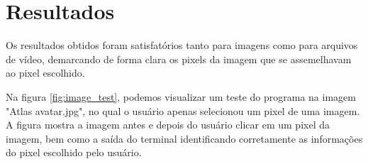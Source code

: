 \documentclass{bmvc2k}
\begin{document}

\section{Resultados}
Os resultados obtidos foram satisfatórios tanto para imagens como para arquivos de vídeo, demarcando de forma clara os pixels da imagem que se assemelhavam ao pixel escolhido.

Na figura \ref{fig:image_test}, podemos visualizar um teste do programa na imagem "Atlas avatar.jpg", no qual o usuário apenas selecionou um pixel de uma imagem. A figura mostra a imagem antes e depois do usuário clicar em um pixel da imagem, bem como a saída do terminal identificando corretamente as informações do pixel escolhido pelo usuário.
\end{document}
